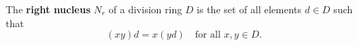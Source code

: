 The \textbf{right nucleus} $N_r$ of a division ring $D$ is the set of all elements $d \in D$ such that
$$(xy)d = x(yd) \quad \text{for all } x, y \in D.$$
